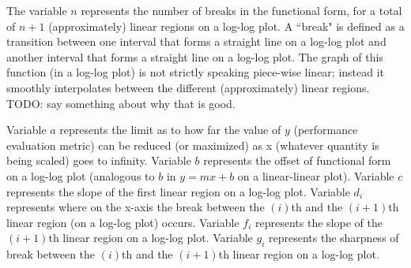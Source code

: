 The variable $n$ represents the number of breaks in the functional form, for a total of $n+1$ (approximately) linear regions on a log-log plot. A ``break" is defined as a transition between one interval that forms a straight line on a log-log plot and another interval that forms a straight line on a log-log plot.
The graph of this function (in a log-log plot) is not strictly speaking piece-wise linear; instead it smoothly interpolates between the different (approximately) linear regions. TODO: say something about why that is good.



Variable $a$ represents the limit as to how far the value of $y$ (performance evaluation metric) can be reduced (or maximized) as x (whatever quantity is being scaled) goes to infinity. Variable $b$ represents the offset of functional form on a log-log plot (analogous to $b$ in $y=mx+b$ on a linear-linear plot). Variable $c$ represents the slope of the first linear region on a log-log plot. Variable $d_i$ represents where on the x-axis the break between the $(i)$th and the $(i+1)$th linear region (on a log-log plot) occurs. Variable $f_i$ represents the slope of the $(i+1)$th linear region on a log-log plot. Variable $g_i$ represents the sharpness of break between the $(i)$th and the $(i+1)$th linear region on a log-log plot.











